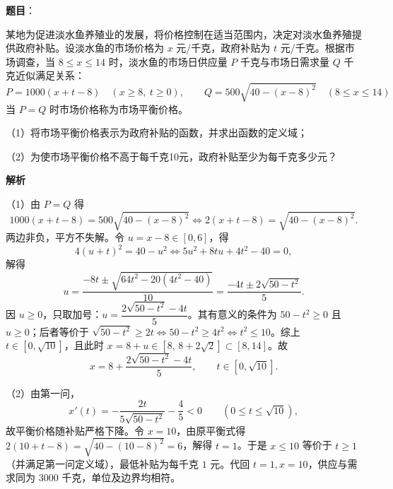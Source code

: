 \begin{answer}

\textbf{题目}：

某地为促进淡水鱼养殖业的发展，将价格控制在适当范围内，决定对淡水鱼养殖提供政府补贴。设淡水鱼的市场价格为 $x$ 元/千克，政府补贴为 $t$ 元/千克。根据市场调查，当 $8\le x\le14$ 时，淡水鱼的市场日供应量 $P$ 千克与市场日需求量 $Q$ 千克近似满足关系：
\nopagebreak[4]
\[
P=1000(x+t-8)\quad(x\ge8,\ t\ge0),\qquad
Q=500\sqrt{40-(x-8)^2}\quad(8\le x\le14)
\]
当 $P=Q$ 时市场价格称为市场平衡价格。

（1）将市场平衡价格表示为政府补贴的函数，并求出函数的定义域；

（2）为使市场平衡价格不高于每千克10元，政府补贴至少为每千克多少元？

\textbf{解析}

（1）由 $P=Q$ 得
\nopagebreak[4]
\[1000(x+t-8)=500\sqrt{40-(x-8)^2}\iff 2(x+t-8)=\sqrt{40-(x-8)^2}.\]
两边非负，平方不失解。令 $u=x-8\in[0,6]$，得
\nopagebreak[4]
\[4(u+t)^2=40-u^2\iff 5u^2+8tu+4t^2-40=0,\]
解得
\nopagebreak[4]
\[u=\frac{-8t\pm\sqrt{64t^2-20(4t^2-40)}}{10}=\frac{-4t\pm2\sqrt{50-t^2}}{5}.\]
因 $u\ge0$，只取加号：$u=\dfrac{2\sqrt{50-t^2}-4t}{5}$。其有意义的条件为 $50-t^2\ge0$ 且 $u\ge0$；后者等价于 $\sqrt{50-t^2}\ge2t\iff 50-t^2\ge4t^2\iff t^2\le10$。综上 $t\in[0,\sqrt{10}]$，且此时 $x=8+u\in[8,\,8+2\sqrt2]\subset[8,14]$。故
\nopagebreak[4]
\[x=8+\frac{2\sqrt{50-t^2}-4t}{5},\qquad t\in[0,\sqrt{10}].\]

（2）由第一问，
\nopagebreak[4]
\[x'(t)=-\frac{2t}{5\sqrt{50-t^2}}-\frac45<0\qquad(0\le t\le\sqrt{10}),\]
故平衡价格随补贴严格下降。令 $x=10$，由原平衡式得 $2(10+t-8)=\sqrt{40-(10-8)^2}=6$，解得 $t=1$。于是 $x\le10$ 等价于 $t\ge1$（并满足第一问定义域），最低补贴为每千克 $1$ 元。代回 $t=1,x=10$，供应与需求同为 $3000$ 千克，单位及边界均相符。


\end{answer}
